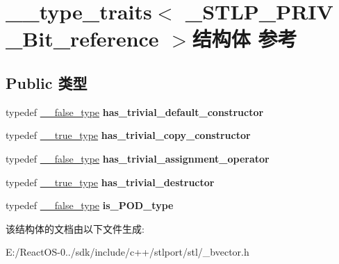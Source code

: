 \hypertarget{struct____type__traits_3_01___s_t_l_p___p_r_i_v_01___bit__reference_01_4}{}\section{\+\_\+\+\_\+type\+\_\+traits$<$ \+\_\+\+S\+T\+L\+P\+\_\+\+P\+R\+IV \+\_\+\+Bit\+\_\+reference $>$结构体 参考}
\label{struct____type__traits_3_01___s_t_l_p___p_r_i_v_01___bit__reference_01_4}
\subsection*{Public 类型}
\begin{DoxyCompactItemize}
\item 
\mbox{\label{struct____type__traits_3_01___s_t_l_p___p_r_i_v_01___bit__reference_01_4_aa1db43abfeed1c2d5fdc5ccfa925f0fa}} 
typedef \hyperlink{struct____false__type}{\+\_\+\+\_\+false\+\_\+type} {\bfseries has\+\_\+trivial\+\_\+default\+\_\+constructor}
\item 
\mbox{\label{struct____type__traits_3_01___s_t_l_p___p_r_i_v_01___bit__reference_01_4_a41162cfd7d03eac05eca065633397683}} 
typedef \hyperlink{struct____true__type}{\+\_\+\+\_\+true\+\_\+type} {\bfseries has\+\_\+trivial\+\_\+copy\+\_\+constructor}
\item 
\mbox{\label{struct____type__traits_3_01___s_t_l_p___p_r_i_v_01___bit__reference_01_4_a67abfc33e0d9ec9674ca6cb0cbff07d0}} 
typedef \hyperlink{struct____false__type}{\+\_\+\+\_\+false\+\_\+type} {\bfseries has\+\_\+trivial\+\_\+assignment\+\_\+operator}
\item 
\mbox{\label{struct____type__traits_3_01___s_t_l_p___p_r_i_v_01___bit__reference_01_4_aa8852e73e1b3e8516776a1a64642c347}} 
typedef \hyperlink{struct____true__type}{\+\_\+\+\_\+true\+\_\+type} {\bfseries has\+\_\+trivial\+\_\+destructor}
\item 
\mbox{\label{struct____type__traits_3_01___s_t_l_p___p_r_i_v_01___bit__reference_01_4_ac8f275caaf9642e93bf5d287286e5c36}} 
typedef \hyperlink{struct____false__type}{\+\_\+\+\_\+false\+\_\+type} {\bfseries is\+\_\+\+P\+O\+D\+\_\+type}
\end{DoxyCompactItemize}


该结构体的文档由以下文件生成\+:\begin{DoxyCompactItemize}
\item 
E\+:/\+React\+O\+S-\/0../sdk/include/c++/stlport/stl/\+\_\+bvector.\+h\end{DoxyCompactItemize}
